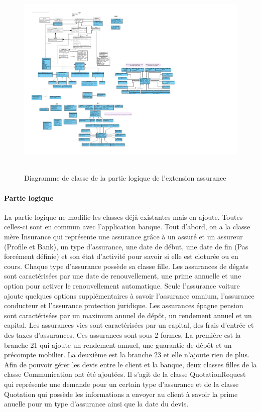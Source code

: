 \documentclass[]{article}
\begin{document}
\begin{figure}[h!]
\hbox{
    \centering\includegraphics[width=\linewidth]{img/ClassDiagramClientAssurance.pdf}
}
\caption{Diagramme de classe de la partie logique de l'extension assurance}
\end{figure}

\paragraph{Partie logique}La partie logique ne modifie les classes déjà existantes mais en ajoute. Toutes celles-ci sont en commun avec l'application banque. Tout d’abord, on a la classe mère Insurance qui représente une assurance grâce à un assuré et un assureur (Profile et Bank), un type d’assurance, une date de début, une date de fin (Pas forcément définie) et son état d’activité pour savoir si elle est cloturée ou en cours. Chaque type d’assurance possède sa classe fille. Les assurances de dégats sont caractérisées par une date de renouvellement, une prime annuelle et une option pour activer le renouvellement automatique. Seule l’assurance voiture ajoute quelques options supplémentaires à savoir l’assurance omnium, l’assurance conducteur et l’assurance protection juridique. Les assurances épagne pension sont caractérisées par un maximum annuel de dépôt, un rendement annuel et un capital. Les assurances vies sont caractérisées par un capital, des frais d’entrée et des taxes d’assurances. Ces assurances sont sous 2 formes. La première est la branche 21 qui ajoute un rendement annuel, une guarantie de dépôt et un précompte mobilier. La deuxième est la branche 23 et elle n’ajoute rien de plus. Afin de pouvoir gérer les devis entre le client et la banque, deux classes filles de la classe Communication ont été ajoutées. Il s’agit de la classe QuotationRequest qui représente une demande pour un certain type d’assurance et de la classe Quotation qui possède les informations a envoyer au client à savoir la prime anuelle pour un type d’assurance ainsi que la date du devis.
\end{document}
